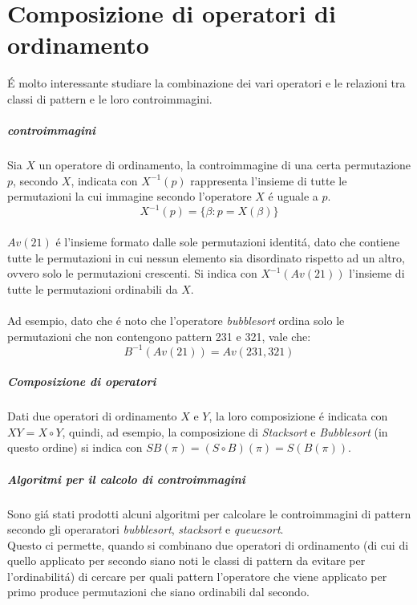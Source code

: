 \chapter{Composizione di operatori di ordinamento}
\'E molto interessante studiare la combinazione dei vari operatori e le relazioni tra classi di pattern e le loro controimmagini.
\paragraph*{controimmagini} Sia $X$ un operatore di ordinamento, la controimmagine di una certa permutazione $p$, secondo $X$, indicata con $X^{-1}(p)$ rappresenta l'insieme di tutte le permutazioni la cui immagine secondo l'operatore $X$ \'e uguale a $p$.$$X^{-1}(p) = \{\beta : p = X(\beta)\}$$\\
$Av(21)$ \'e l'insieme formato dalle sole permutazioni identit\'a, dato che contiene tutte le permutazioni in cui nessun elemento sia disordinato rispetto ad un altro, ovvero solo le permutazioni crescenti. Si indica con $X^{-1}(Av(21))$ l'insieme di tutte le permutazioni ordinabili da $X$.\\\\
Ad esempio, dato che \'e noto che l'operatore \textit{bubblesort} ordina solo le permutazioni che non contengono pattern 231 e 321\cite{claesson2012sorting}, vale che:$$B^{-1}(Av(21)) = Av(231,321)$$
\paragraph*{Composizione di operatori} Dati due operatori di ordinamento $X$ e $Y$, la loro composizione \'e indicata con $ XY = X \circ Y$, quindi, ad esempio, la composizione di \textit{Stacksort} e \textit{Bubblesort} (in questo ordine) si indica con $SB(\pi) = (S \circ B)(\pi) = S(B(\pi))$.
\paragraph*{Algoritmi per il calcolo di controimmagini} Sono gi\'a stati prodotti alcuni algoritmi per calcolare le controimmagini di pattern secondo gli operaratori \textit{bubblesort}\cite{albert2010inverse}, \textit{stacksort}\cite{claesson2012sorting} e \textit{queuesort}\cite{magnusson2013sorting}\cite{cioni2021characterization}.\\
Questo ci permette, quando si combinano due operatori di ordinamento (di cui di quello applicato per secondo siano noti le classi di pattern da evitare per l'ordinabilit\'a) di cercare per quali pattern l'operatore che viene applicato per primo produce permutazioni che siano ordinabili dal secondo.
